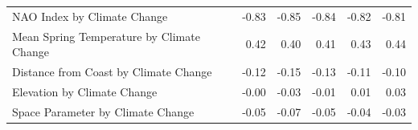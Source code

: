 \documentclass{article}\usepackage[]{graphicx}\usepackage[]{color}
\begin{document}
{\begin{table}[H]
\begin{tabular}{lrrrrr}
  NAO Index by Climate Change & -0.83 & -0.85 & -0.84 & -0.82 & -0.81 \\ 
  Mean Spring 
Temperature by Climate Change & 0.42 & 0.40 & 0.41 & 0.43 & 0.44 \\ 
  Distance from 
Coast by Climate Change & -0.12 & -0.15 & -0.13 & -0.11 & -0.10 \\ 
  Elevation by Climate Change & -0.00 & -0.03 & -0.01 & 0.01 & 0.03 \\ 
  Space Parameter by Climate Change & -0.05 & -0.07 & -0.05 & -0.04 & -0.03 \\ 
   \hline
\end{tabular}
\end{table}

}
\end{document}
